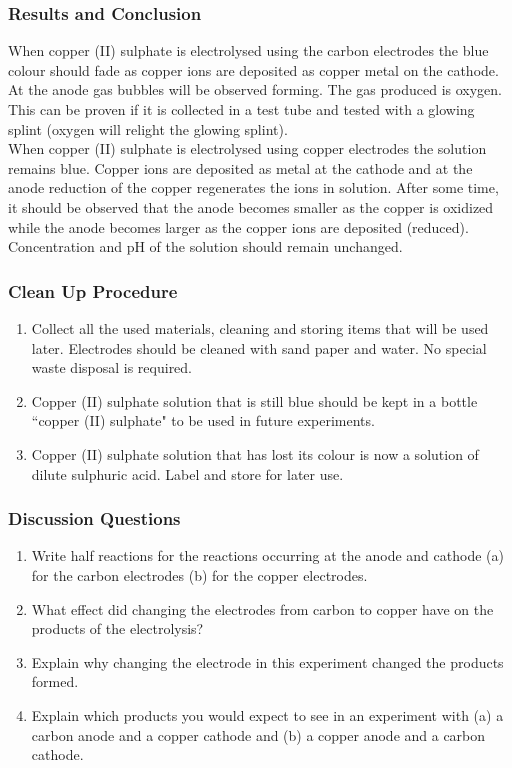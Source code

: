 \subsubsection*{Results and Conclusion}
When copper (II) sulphate is electrolysed using the carbon electrodes the blue colour should fade as copper ions are deposited as copper metal on the cathode.  At the anode gas bubbles will be observed forming. The gas produced is oxygen. This can be proven if it is collected in a test tube and tested with a glowing splint (oxygen will relight the glowing splint).
\\When copper (II) sulphate is electrolysed using copper electrodes the solution remains blue. Copper ions are deposited as metal at the cathode and at the anode reduction of the copper regenerates the ions in solution. After some time, it should be observed that the anode becomes smaller as the copper is oxidized while the anode becomes larger as the copper ions are deposited (reduced). Concentration and pH of the solution should remain unchanged.

\subsubsection*{Clean Up Procedure}
\begin{enumerate}
\item{Collect all the used materials, cleaning and storing items that will be used later. Electrodes should be cleaned with sand paper and water. No special waste disposal is required.}
\item{Copper (II) sulphate solution that is still blue should be kept in a bottle ``copper (II) sulphate" to be used in future experiments.}
\item{Copper (II) sulphate solution that has lost its colour is now a solution of dilute sulphuric acid. Label and store for later use.}
\end{enumerate}

\subsubsection*{Discussion Questions}
\begin{enumerate}
\item{Write half reactions for the reactions occurring at the anode and cathode (a) for the carbon electrodes (b) for the copper electrodes.}
\item{What effect did changing the electrodes from carbon to copper have on the products of the electrolysis?}
\item{Explain why changing the electrode in this experiment changed the products formed.}
\item{Explain which products you would expect to see in an experiment with (a) a carbon anode and a copper cathode and (b) a copper anode and a carbon cathode.}
\end{enumerate}

